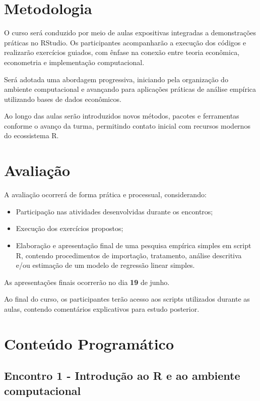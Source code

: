 \documentclass[12pt,a4paper]{article}
\begin{document}
	\section*{Metodologia}
	
	
	O curso será conduzido por meio de aulas expositivas integradas a demonstrações práticas no RStudio. Os participantes acompanharão a execução dos códigos e realizarão exercícios guiados, com ênfase na conexão entre teoria econômica, econometria e implementação computacional.
		
	Será adotada uma abordagem progressiva, iniciando pela organização do ambiente computacional e avançando para aplicações práticas de análise empírica utilizando bases de dados econômicos.
	
	Ao longo das aulas serão introduzidos novos métodos, pacotes e ferramentas conforme o avanço da turma, permitindo contato inicial com recursos modernos do ecossistema R.
	
	\section*{Avaliação}
	
	A avaliação ocorrerá de forma prática e processual, considerando:
	
	\begin{itemize}
		\item Participação nas atividades desenvolvidas durante os encontros;
		
		\item Execução dos exercícios propostos;
		
		\item Elaboração e apresentação final de uma pesquisa empírica simples em script R, contendo procedimentos de importação, tratamento, análise descritiva e/ou estimação de um modelo de regressão linear simples.
	\end{itemize}
	
	As apresentações finais ocorrerão no dia \textbf{19} de junho.
	
	Ao final do curso, os participantes terão acesso aos scripts utilizados durante as aulas, contendo comentários explicativos para estudo posterior.
	
	\section*{Conteúdo Programático}
	
	\subsection*{Encontro 1 - Introdução ao R e ao ambiente computacional}
	
\end{document}
